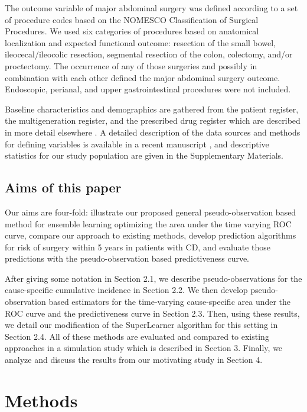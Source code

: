 \documentclass{statsoc}
\begin{document}
The outcome variable of major abdominal surgery was defined according to a set of procedure codes based on the NOMESCO Classification of Surgical Procedures. We used six categories of procedures based on anatomical localization and expected functional outcome: resection of the small bowel, ileocecal/ileocolic resection, segmental resection of the colon, colectomy, and/or proctectomy. The occurrence of any of those surgeries and possibly in combination with each other defined the major abdominal surgery outcome. Endoscopic, perianal, and upper gastrointestinal procedures were not included. 

Baseline characteristics and demographics are gathered from the patient register, the multigeneration register, and the prescribed drug register which are described in more detail elsewhere \citep{ludvigsson2016registers}. A detailed description of the data sources and methods for defining variables is available in a recent manuscript \citep{olen2017childhood}, and descriptive statistics for our study population are given in the Supplementary Materials.


\subsection{Aims of this paper}
Our aims are four-fold: illustrate our proposed general pseudo-observation based method for ensemble learning optimizing the area under the time varying ROC curve, compare our approach to existing methods, develop prediction algorithms for risk of surgery within 5 years in patients with CD, and evaluate those predictions with the pseudo-observation based predictiveness curve. 

After giving some notation in Section 2.1, we describe pseudo-observations for the cause-specific cumulative incidence in Section 2.2. We then develop pseudo-observation based estimators for the time-varying cause-specific area under the ROC curve and the predictiveness curve in Section 2.3. Then, using these results, we detail our modification of the SuperLearner algorithm for this setting in Section 2.4. All of these methods are evaluated and compared to existing approaches in a simulation study which is described in Section 3. Finally, we analyze and discuss the results from our motivating study in Section 4. 

\section{Methods}
\end{document}
